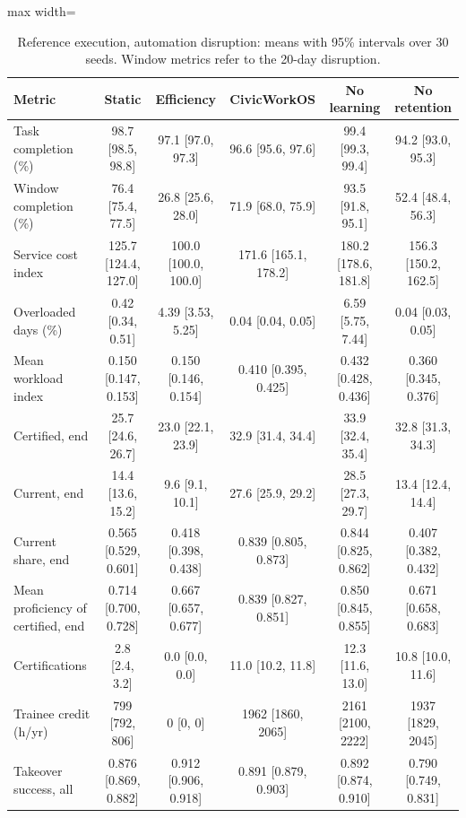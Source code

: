 \documentclass[utf8]{frontiers_suppmat}
\begin{document}
\begin{table}[!htbp]
	\caption{Reference execution, automation disruption: means with 95\% intervals over 30 seeds. Window metrics refer to the 20-day disruption.}
	\label{tab:ext-disruption}
	\scriptsize
	\setlength{\tabcolsep}{2pt}
	\begin{adjustbox}{max width=\textwidth}
	\begin{tabular}{@{}lccccc@{}}
		\toprule
		\textbf{Metric} & \textbf{Static} & \textbf{Efficiency} & \textbf{CivicWorkOS} & \textbf{No learning} & \textbf{No retention}\\
		\midrule
Task completion (\%) & 98.7 [98.5, 98.8] & 97.1 [97.0, 97.3] & 96.6 [95.6, 97.6] & 99.4 [99.3, 99.4] & 94.2 [93.0, 95.3]\\
Window completion (\%) & 76.4 [75.4, 77.5] & 26.8 [25.6, 28.0] & 71.9 [68.0, 75.9] & 93.5 [91.8, 95.1] & 52.4 [48.4, 56.3]\\
Service cost index & 125.7 [124.4, 127.0] & 100.0 [100.0, 100.0] & 171.6 [165.1, 178.2] & 180.2 [178.6, 181.8] & 156.3 [150.2, 162.5]\\
Overloaded days (\%) & 0.42 [0.34, 0.51] & 4.39 [3.53, 5.25] & 0.04 [0.04, 0.05] & 6.59 [5.75, 7.44] & 0.04 [0.03, 0.05]\\
Mean workload index & 0.150 [0.147, 0.153] & 0.150 [0.146, 0.154] & 0.410 [0.395, 0.425] & 0.432 [0.428, 0.436] & 0.360 [0.345, 0.376]\\
Certified, end & 25.7 [24.6, 26.7] & 23.0 [22.1, 23.9] & 32.9 [31.4, 34.4] & 33.9 [32.4, 35.4] & 32.8 [31.3, 34.3]\\
Current, end & 14.4 [13.6, 15.2] & 9.6 [9.1, 10.1] & 27.6 [25.9, 29.2] & 28.5 [27.3, 29.7] & 13.4 [12.4, 14.4]\\
Current share, end & 0.565 [0.529, 0.601] & 0.418 [0.398, 0.438] & 0.839 [0.805, 0.873] & 0.844 [0.825, 0.862] & 0.407 [0.382, 0.432]\\
Mean proficiency of certified, end & 0.714 [0.700, 0.728] & 0.667 [0.657, 0.677] & 0.839 [0.827, 0.851] & 0.850 [0.845, 0.855] & 0.671 [0.658, 0.683]\\
Certifications & 2.8 [2.4, 3.2] & 0.0 [0.0, 0.0] & 11.0 [10.2, 11.8] & 12.3 [11.6, 13.0] & 10.8 [10.0, 11.6]\\
Trainee credit (h/yr) & 799 [792, 806] & 0 [0, 0] & 1962 [1860, 2065] & 2161 [2100, 2222] & 1937 [1829, 2045]\\
Takeover success, all & 0.876 [0.869, 0.882] & 0.912 [0.906, 0.918] & 0.891 [0.879, 0.903] & 0.892 [0.874, 0.910] & 0.790 [0.749, 0.831]\\

\end{tabular}
\end{adjustbox}
\end{table}
\end{document}

